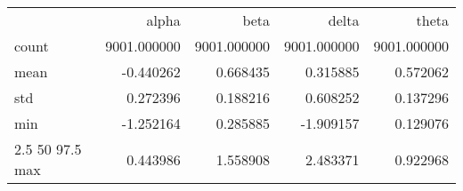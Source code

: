 \begin{tabular}{lrrrr}
 & alpha & beta & delta & theta \\
count & 9001.000000 & 9001.000000 & 9001.000000 & 9001.000000 \\
mean & -0.440262 & 0.668435 & 0.315885 & 0.572062 \\
std & 0.272396 & 0.188216 & 0.608252 & 0.137296 \\
min & -1.252164 & 0.285885 & -1.909157 & 0.129076 \\
2.5%
50%
97.5%
max & 0.443986 & 1.558908 & 2.483371 & 0.922968 \\
\end{tabular}
